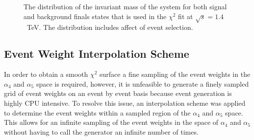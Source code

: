 \begin{figure}
\centering
{}
\caption[The distribution of the invariant mass of the system for both signal and background finals states that is used in the $\chi^{2}$ fit at $\sqrt{s}=1.4$~TeV.  The distribution includes affect of event selection.]{The distribution of the invariant mass of the system for both signal and background finals states that is used in the $\chi^{2}$ fit at $\sqrt{s}=1.4$~TeV.  The distribution includes affect of event selection.}
\label{fig:signalbackgroundfit}
\end{figure}


\subsection{Event Weight Interpolation Scheme}
\label{sec:eventweightsinterpolation}
In order to obtain a smooth $\chi^{2}$ surface a fine sampling of the event weights in the $\alpha_{4}$ and $\alpha_{5}$ space is required, however, it is unfeasible to generate a finely sampled grid of event weights on an event by event basis because event generation is highly CPU intensive.  To resolve this issue, an interpolation scheme was applied to determine the event weights within a sampled region of the $\alpha_{4}$ and $\alpha_{5}$ space.  This allows for an infinite sampling of the event weights in the space of $\alpha_{4}$ and $\alpha_{5}$ without having to call the generator an infinite number of times.

